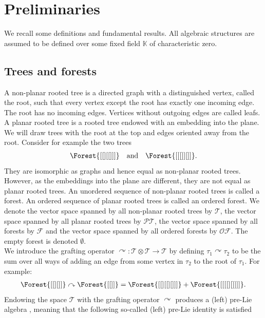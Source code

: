 \documentclass[10pt,a4paper]{article}
\begin{document}
\section{Preliminaries} 
\label{section::1}

We recall some definitions and fundamental results. All algebraic structures are assumed to be defined over some fixed field $\mathbb{K}$ of characteristic zero.


\subsection{Trees and forests} 
\label{ssec:TreesForests}

A non-planar rooted tree is a directed graph with a distinguished vertex, called the root, such that every vertex except the root has exactly one incoming edge. The root has no incoming edges. Vertices without outgoing edges are called leafs. A planar rooted tree is a rooted tree endowed with an embedding into the plane. We will draw trees with the root at the top and edges oriented away from the root. Consider for example the two trees
\begin{align*}
\Forest{[[][[]]]} \quad \text{and} \quad  \Forest{[[[]][]]}.
\end{align*}
They are isomorphic as graphs and hence equal as non-planar rooted trees. However, as the embeddings into the plane are different, they are not equal as planar rooted trees. An unordered sequence of non-planar rooted trees is called a forest. An ordered sequence of planar rooted trees is called an ordered forest. We denote the vector space spanned by all non-planar rooted trees by $\mathcal{T}$, the vector space spanned by all planar rooted trees by $\mathcal{PT}$, the vector space spanned by all forests by $\mathcal{F}$ and the vector space spanned by all ordered forests by $\mathcal{OF}$. The empty forest is denoted $\emptyset$.\\
We introduce the grafting operator $\curvearrowright : \mathcal{T} \otimes \mathcal{T} \to \mathcal{T}$ by defining $\tau_1 \curvearrowright \tau_2$ to be the sum over all ways of adding an edge from some vertex in $\tau_2$ to the root of $\tau_1$. For example:
\allowdisplaybreaks
\begin{align*}
\Forest{[[][]]} \curvearrowright \Forest{[[]]}= \Forest{[[][[][]] ]}+\Forest{[[[[][]]]]}.
\end{align*}
Endowing the space $\mathcal{T}$ with the grafting operator $\curvearrowright$ produces a (left) pre-Lie algebra \cite{Burde2006,Cartier11,ChapotonLivernet2001,Livernet2006,Manchon2009,OudomGuin2008}, meaning that the following so-called (left) pre-Lie identity is satisfied
\end{document}
